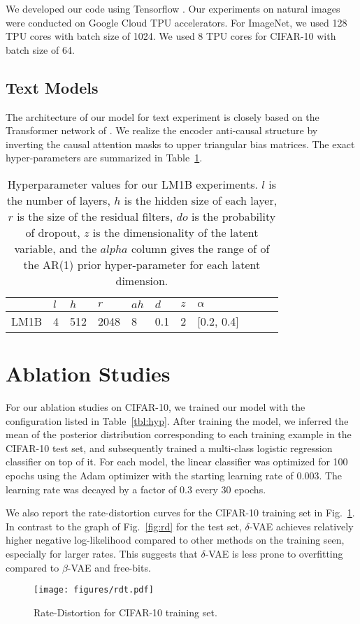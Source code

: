 \documentclass{article} \usepackage{iclr2019_conference,times}
\def\figref#1{figure~\ref{#1}}
\renewcommand{\figref}[1]{Fig.~\ref{#1}}
\newcommand{\tblref}[1]{Table~\ref{#1}}
\begin{document}
We developed our code using Tensorflow \citep{tensorflow}. Our experiments on natural images were conducted on Google Cloud TPU accelerators. For ImageNet, we used 128 TPU cores with batch size of 1024. We used 8 TPU cores for CIFAR-10 with batch size of 64.




\subsection{Text Models}
The architecture of our model for text experiment is closely based on the Transformer network of \cite{Vaswani2017}. We realize the encoder anti-causal structure by inverting the causal attention masks to upper triangular bias matrices. The exact hyper-parameters are summarized in \tblref{tbl:txthyp}.

\begin{table}[ht]
\centering
\begin{tabular}{@{}l|llllllllll@{}}
                    &  $l$ & $h$ & $r$ & $ah$ & $d$ & $z$ & $\alpha$\\
\toprule
LM1B     & 4 & 512&  2048 & 8 & 0.1 & 2 & [0.2, 0.4] \\
\bottomrule
\end{tabular}
\caption{Hyperparameter values for our LM1B experiments. $l$ is the number of layers, $h$ is the hidden size of each layer, $r$ is the size of the residual filters, $do$ is the probability of dropout, $z$ is the dimensionality of the latent variable, and the $alpha$ column gives the range of of the AR(1) prior hyper-parameter for each latent dimension.}\label{tbl:txthyp}
\end{table}

\section{Ablation Studies}\label{app:abl}
For our ablation studies on CIFAR-10, we trained our model with the configuration listed in \tblref{tbl:hyp}. After training the model, we inferred the mean of the posterior distribution corresponding to each training example in the CIFAR-10 test set, and subsequently trained a multi-class logistic regression classifier on top of it. For each model, the linear classifier was optimized for 100 epochs using the Adam optimizer with the starting learning rate of $0.003$. The learning rate was decayed by a factor of $0.3$ every 30 epochs.

We also report the rate-distortion curves for the CIFAR-10 training set in \figref{fig:rdt}. In contrast to 
the graph of \figref{fig:rd} for the test set, $\delta$-VAE achieves relatively higher negative log-likelihood compared to other methods on the training seen, especially for larger rates. This suggests that $\delta$-VAE is less prone to overfitting compared to $\beta$-VAE and free-bits.
\begin{figure}[h!]
    \centering
    \texttt{[image: figures/rdt.pdf]}
    \caption{Rate-Distortion for CIFAR-10 training set.}        
    \label{fig:rdt}
\end{figure}
\end{document}
